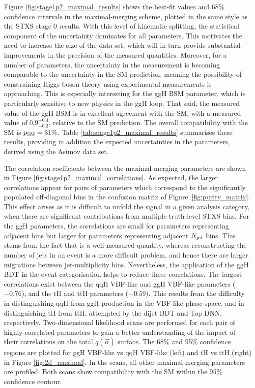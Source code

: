 Figure \ref{fig:stage1p2_maximal_results} shows the \xsbr best-fit values and 68\% confidence intervals in the maximal-merging scheme, plotted in the same style as the STXS stage 0 results. With this level of kinematic splitting, the statistical component of the uncertainty dominates for all parameters. This motivates the need to increase the size of the data set, which will in turn provide substantial improvements in the precision of the measured quantities. Moreover, for a number of parameters, the uncertainty in the measurement is becoming comparable to the uncertainty in the SM prediction, meaning the possibility of constraining Higgs boson theory using experimental measurements is approaching. This is especially interesting for the ggH BSM parameter, which is particularly sensitive to new physics in the ggH loop. That said, the measured value of the ggH BSM \xsbr is in excellent agreement with the SM, with a measured value of $0.9^{+0.4}_{-0.3}$, relative to the SM prediction. The overall compatibility with the SM is $p_{\rm{SM}}=31\%$. Table \ref{tab:stage1p2_maximal_results} summarises these results, providing in addition the expected uncertainties in the parameters, derived using the Asimov data set. 

The correlation coefficients between the maximal-merging parameters are shown in Figure \ref{fig:stage1p2_maximal_correlations}. As expected, the larger correlations appear for pairs of parameters which correspond to the significantly populated off-diagonal bins in the confusion matrix of Figure~\ref{fig:purity_matrix}. This effect arises as it is difficult to unfold the signal in a given analysis category, when there are significant contributions from multiple truth-level STXS bins. For the ggH parameters, the correlations are small for parameters representing adjacent \ptH bins but larger for parameters representing adjacent $N_{\rm{jet}}$ bins. This stems from the fact that \ptgg is a well-measured quantity, whereas reconstructing the number of jets in an event is a more difficult problem, and hence there are larger migrations between jet-multiplicity bins. Nevertheless, the application of the ggH BDT in the event categorisation helps to reduce these correlations. The largest correlations exist between the qqH VBF-like and ggH VBF-like parameters ($-0.76$), and the tH and ttH parameters ($-0.59$). This results from the difficulty in distinguishing qqH from ggH production in the VBF-like phase-space, and in distinguishing tH from ttH, attempted by the dijet BDT and Top DNN, respectively. Two-dimensional likelihood scans are performed for each pair of highly-correlated parameters to gain a better understanding of the impact of their correlations on the total $q(\vec{\alpha})$ surface. The 68\% and 95\% confidence regions are plotted for ggH VBF-like vs qqH VBF-like (left) and tH vs ttH (right) in Figure \ref{fig:2d_maximal}. In the scans, all other maximal-merging parameters are profiled. Both scans show compatibility with the SM within the 95\% confidence contour.

